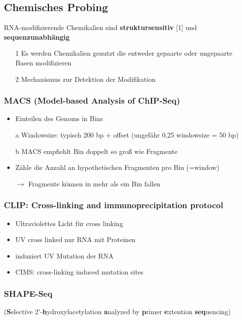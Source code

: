 \subsection{Chemisches Probing}
RNA-modifizierende Chemikalien sind \textbf{struktursensitiv} [1] und \textbf{sequenzunabhängig} \\
\begin{itemize}
\item[1] Es werden Chemikalien genutzt die entweder gepaarte oder ungepaarte Basen modifizieren
\item[2] Mechanismus zur Detektion der Modifikation
\end{itemize}

\subsubsection{MACS (Model-based Analysis of ChIP-Seq)}
\begin{itemize}
\item Einteilen des Genoms in Bins
\item[a] Windowsize: typisch 200 bp + offset (ungefähr 0,25 windowsize = 50 bp)
\item[b] MACS empfiehlt Bin doppelt so groß wie Fragmente
\item Zähle die Anzahl an hypothetischen Fragmenten pro Bin (=window)
\item[$\rightarrow$] Fragmente können in mehr als ein Bin fallen
\end{itemize}

\subsubsection{CLIP: Cross-linking and immunoprecipitation protocol}
\begin{itemize}
\item Ultraviolettes Licht für cross linking
\item UV cross linked nur RNA mit Proteinen
\item induziert UV Mutation der RNA
\item CIMS: cross-linking induced mutation sites
\end{itemize}

\subsubsection{SHAPE-Seq}
(\textbf{S}elective 2'-\textbf{h}ydroxylacetylation \textbf{a}nalyzed by \textbf{p}rimer \textbf{e}xtention \textbf{seq}uencing)


